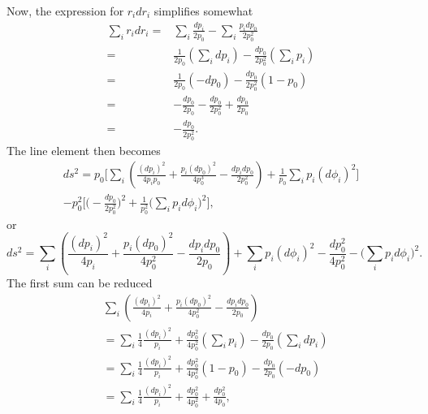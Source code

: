 Now, the expression for $r_idr_i$ simplifies somewhat
\begin{equation}
\begin{split}
\sum_i r_idr_i =& \sum_i\frac{dp_i}{2p_0} - \sum_i\frac{p_idp_0}{2p_0^2}\\
               =& \frac{1}{2p_0}\left(\sum_i dp_i\right)
                  - \frac{dp_0}{2p_0^2}\left(\sum_i p_i\right)\\
               =& \frac{1}{2p_0}\left( -dp_0 \right)
                  - \frac{dp_0}{2p_0^2}\left( 1 - p_0 \right)\\
               =& - \frac{dp_0}{2p_0} - \frac{dp_0}{2p_0^2} + \frac{dp_0}{2p_0}\\
               =&  - \frac{dp_0}{2p_0^2}.
\end{split}
\end{equation}
The line element then becomes
\begin{multline}
ds^2 = p_0 \biggl[
    \sum_i\left( \frac{(dp_i)^2}{4p_ip_0}
                 + \frac{p_i(dp_0)^2}{4p_0^3}
                 - \frac{dp_idp_0}{2p_0^2}
          \right) 
    + \frac{1}{p_0} \sum_i p_i\left(d\phi_i\right)^2\biggr]\\
- p_0^2 \biggl[\biggl(
                      - \frac{dp_0}{2p_0^2}
               \biggr)^2
           + \frac{1}{p_0^2}\biggl(\sum_i p_id\phi_i\biggr)^2
    \biggr],
\end{multline}
or
\begin{equation}
ds^2 = \sum_i\left( \frac{(dp_i)^2}{4p_i}
                 + \frac{p_i(dp_0)^2}{4p_0^2}
                 - \frac{dp_idp_0}{2p_0}
             \right) 
    + \sum_i p_i\left(d\phi_i\right)^2
    - \frac{dp_0^2}{4p_0^2}
    - \biggl(\sum_i p_id\phi_i\biggr)^2.
\label{e:fsPolarHalfC}
\end{equation}
The first sum can be reduced
\begin{equation}
\begin{split}
&\sum_i\left( \frac{(dp_i)^2}{4p_i}
             + \frac{p_i(dp_0)^2}{4p_0^2}
             - \frac{dp_idp_0}{2p_0}
      \right) \\
&= \sum_i\frac{1}{4}\frac{(dp_i)^2}{p_i}
   + \frac{dp_0^2}{4p_0^2}\left(\sum_i p_i\right)
   - \frac{dp_0}{2p_0}\left( \sum_i dp_i \right)\\
&= \sum_i\frac{1}{4}\frac{(dp_i)^2}{p_i}
   + \frac{dp_0^2}{4p_0^2}\left( 1 - p_0 \right)
   - \frac{dp_0}{2p_0}\left( -dp_0 \right)\\
&= \sum_i\frac{1}{4}\frac{(dp_i)^2}{p_i}
   + \frac{dp_0^2}{4p_0^2}
   + \frac{dp_0^2}{4p_0},
\end{split}
\end{equation}
